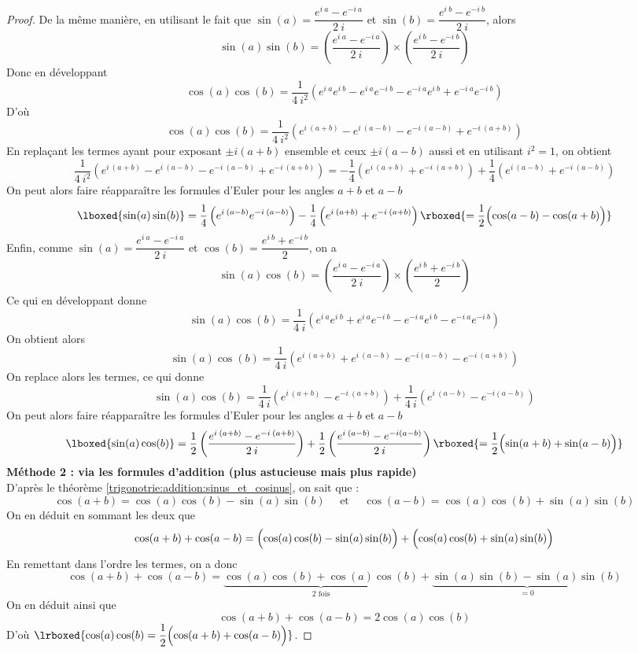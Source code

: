 \begin{proof}
De la même manière, en utilisant le fait que $\sin(a) = \dfrac{e^{i \: a} - e^{-i \: a}}{2\:i}$ et $\sin(b) = \dfrac{e^{i\:b} - e^{-i\:b}}{2\:i}$, alors
\[
\sin(a)\sin(b) 
= \left(\dfrac{e^{i \: a} - e^{-i \: a}}{2\:i}\right) \times  \left(\dfrac{e^{i \: b} - e^{-i \: b}}{2\:i}\right)
\]
Donc en développant
\[
\cos(a)\cos(b) 
= \dfrac{1}{4\:i^2}\left(e^{i \:a}e^{i \:b}-e^{i \:a}e^{-i \:b}-e^{-i \:a}e^{i \:b}+ e^{-i \:a}e^{-i \:b}\right) 
\]
D'où
\[
\cos(a)\cos(b)  = \dfrac{1}{4\:i^2}\left(e^{i \:(a+b)} - e^{i \:(a-b)} - e^{-i \:(a - b)} + e^{-i \:(a + b)}\right)
\]
En replaçant les termes ayant pour exposant $\pm i(a+b)$ ensemble et ceux $\pm i (a-b)$ aussi et en utilisant $i^2=1$, on obtient
\[
\dfrac{1}{4\:i^2}\left(e^{i \:(a+b)}-e^{i \:(a-b)}- e^{-i \:(a - b)}+ e^{-i \:(a +b)}\right)
= - \dfrac{1}{4}\left(e^{i \:(a+b)}+ e^{-i \:(a + b)}\right) + \dfrac{1}{4}\left(e^{i \:(a-b)}+ e^{-i \:(a - b)}\right)
\]
On peut alors faire réapparaître les formules d'Euler pour les angles $a+b$ et $a-b$ 
\[
\lboxed{\sin(a)\sin(b)} 
= \dfrac{1}{4}\left(e^{i \:(a-b)} e^{-i \:(a - b)}\right) - \dfrac{1}{4}\left(e^{i \:(a+b)} + e^{-i \:(a + b)}\right)
\rboxed{=  \dfrac{1}{2}\Bigl(\cos(a-b)-\cos(a+b)\Bigr)}
\]
Enfin, comme $\sin(a)=\dfrac{e^{i \: a} - e^{-i \: a}}{2\:i}$ et $\cos(b)=\dfrac{e^{i \: b} + e^{-i \: b}}{2}$, on a 
\[
\sin(a)\cos(b)= \left(\dfrac{e^{i \: a} - e^{-i \: a}}{2\:i}\right)\times\left(\dfrac{e^{i \: b} + e^{-i \: b}}{2}\right)
\]
Ce qui en développant donne
\[
\sin(a)\cos(b)= \dfrac{1}{4\: i}\left(e^{i \: a}e^{i \: b} + e^{i \: a}e^{-i \: b}-e^{-i \: a}e^{i \: b}-e^{-i \: a}e^{-i \: b}\right)
\]
On obtient alors
\[
\sin(a)\cos(b) =\dfrac{1}{4\: i}\left(e^{i \: (a + b)} + e^{i \: (a-b)} - e^{-i(a-b)} - e^{-i \: (a+b)}\right)
\]
On replace alors les termes, ce qui donne
\[
\sin(a)\cos(b)=\dfrac{1}{4\: i}\left(e^{i \: (a + b)} - e^{-i \: (a+b)} \right) + \dfrac{1}{4\: i}\left(e^{i \: (a-b)} - e^{-i(a-b)} \right)
\]
On peut alors faire réapparaître les formules d'Euler pour les angles $a+b$ et $a-b$ 
\[
\lboxed{\sin(a)\cos(b)} = \dfrac{1}{2}\left(\dfrac{e^{i \: (a + b)} - e^{-i \: (a+b)}}{2\: i} \right) + \dfrac{1}{2}\left(\dfrac{e^{i \: (a-b)} - e^{-i(a-b)}}{2\: i}\right) 
\rboxed{= \dfrac{1}{2}\Bigl(\sin(a+b)+\sin(a-b)\Bigr)}
\]
\textbf{Méthode 2 : via les formules d'addition (plus astucieuse mais plus rapide)}\\
D'après le théorème \ref{trigonotrie:addition:sinus_et_cosinus}, on sait que :
\[
\cos(a+b) = \cos(a)\cos(b)-\sin(a)\sin(b) \quad\text{ et }\quad \cos(a-b)=\cos(a)\cos(b)+\sin(a)\sin(b)
\]
On en déduit en sommant les deux que
\[
\cos(a+b) + \cos(a-b) = \Bigl(\cos(a)\cos(b)-\sin(a)\sin(b)\Bigr) + \Bigl(\cos(a)\cos(b)+\sin(a)\sin(b)\Bigr)
\]
En remettant dans l'ordre les termes, on a donc
\[
\cos(a+b) + \cos(a-b) = \underbrace{\cos(a)\cos(b)+ \cos(a)\cos(b)}_{\text{$2$ fois}}+\underbrace{\sin(a)\sin(b)-\sin(a)\sin(b)}_{=0}
\]
On en déduit ainsi que 
\[
\cos(a+b) + \cos(a-b) = 2 \cos(a)\cos(b)
\]
D'où $\lrboxed{\cos(a)\cos(b) = \dfrac{1}{2}\Bigl(\cos(a+b)+\cos(a-b)\Bigr)}$.


\end{proof}
